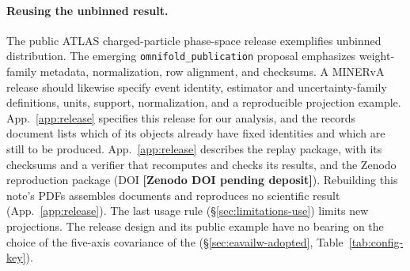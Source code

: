 \paragraph{Reusing the unbinned result.} The public ATLAS charged-particle phase-space release \cite{ATLAS:2026fpsdata} exemplifies unbinned distribution. The emerging \texttt{omnifold\_publication} proposal \cite{Bajpai:2026publication} emphasizes weight-family metadata, normalization, row alignment, and checksums. A MINERvA release should likewise specify event identity, estimator and uncertainty-family definitions, units, support, normalization, and a reproducible projection example. App.~\ref{app:release} specifies this release for our analysis, and the records document lists which of its objects already have fixed identities and which are still to be produced. App.~\ref{app:release} describes the replay package, with its checksums and a verifier that recomputes and checks its results, and the Zenodo reproduction package (DOI \textbf{[Zenodo DOI pending deposit]}). Rebuilding this note's PDFs assembles documents and reproduces no scientific result (App.~\ref{app:release}). The last usage rule (\S\ref{sec:limitations-use}) limits new projections. The release design and its public example have no bearing on the choice of the five-axis covariance of the \resFiveAxis{} (\S\ref{sec:eavailw-adopted}, Table~\ref{tab:config-key}).
